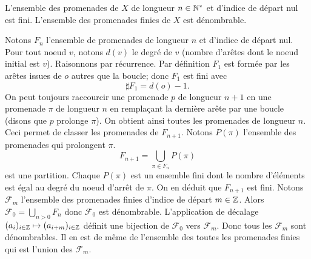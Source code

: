 \begin{propn}\label{Prop:DenomProm}
L'ensemble des promenades de $X$ de longueur $n\in \mathbb{N}^*$ et d'indice de départ nul est fini.\newline
L'ensemble des promenades finies de $X$ est dénombrable.
\end{propn}
\begin{demo}
 Notons $F_n$ l'ensemble de promenades de longueur $n$ et d'indice de départ nul. Pour tout noeud $v$, notons $d(v)$ le degré de $v$ (nombre d'arêtes dont le noeud initial est $v$). Raisonnons par récurrence.\newline
 Par définition $F_1$ est formée par les arêtes issues de $o$ autres que la boucle; donc $F_1$ est fini avec
 \begin{displaymath}
  \sharp F_1 = d(o) - 1.
 \end{displaymath}
On peut toujours raccourcir une promenade $p$ de longueur $n+1$ en une promenade $\pi$ de longueur $n$ en remplaçant la dernière arête par une boucle (disons que $p$ prolonge $\pi$). On obtient ainsi toutes les promenades de longueur $n$. Ceci permet de classer les promenades de $F_{n+1}$. Notons $P(\pi)$ l'ensemble des promenades qui prolongent $\pi$.
\begin{displaymath}
 F_{n+1} = \bigcup_{\pi \in F_n}P(\pi)
\end{displaymath}
est une partition.
Chaque $P(\pi)$ est un ensemble fini dont le nombre d'éléments est égal au degré du noeud d'arrêt de $\pi$. On en déduit que $F_{n+1}$ est fini.\newline
Notons $\mathcal{F}_m$ l'ensemble des promenades finies d'indice de départ $m\in \mathbb{Z}$. Alors $\mathcal{F}_0 = \bigcup_{n>0} F_n$ donc $\mathcal{F}_0$ est dénombrable.\newline
L'application de décalage $(a_i)_{i\in \mathbb{Z}} \mapsto (a_{i+m})_{i\in \mathbb{Z}}$ définit une bijection de $\mathcal{F}_0$ vers $\mathcal{F}_m$. Donc tous les $\mathcal{F}_m$ sont dénombrables. Il en est de même de l'ensemble des toutes les promenades finies qui est l'union des $\mathcal{F}_m$.
\end{demo}

